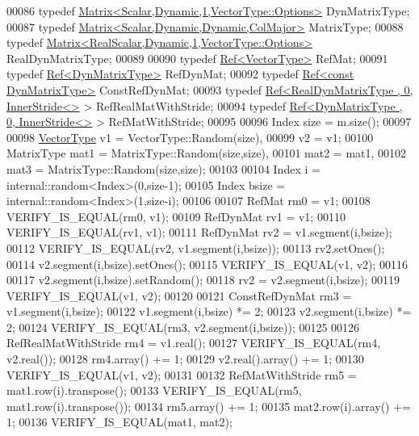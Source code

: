\begin{DoxyCode}
00086   \textcolor{keyword}{typedef} \hyperlink{group___core___module_class_eigen_1_1_matrix}{Matrix<Scalar,Dynamic,1,VectorType::Options>} 
      DynMatrixType;
00087   \textcolor{keyword}{typedef} \hyperlink{group___core___module_class_eigen_1_1_matrix}{Matrix<Scalar,Dynamic,Dynamic,ColMajor>} MatrixType;
00088   \textcolor{keyword}{typedef} \hyperlink{group___core___module_class_eigen_1_1_matrix}{Matrix<RealScalar,Dynamic,1,VectorType::Options>} 
      RealDynMatrixType;
00089   
00090   \textcolor{keyword}{typedef} \hyperlink{group___core___module_class_eigen_1_1_ref}{Ref<VectorType>} RefMat;
00091   \textcolor{keyword}{typedef} \hyperlink{group___core___module_class_eigen_1_1_ref}{Ref<DynMatrixType>} RefDynMat;
00092   \textcolor{keyword}{typedef} \hyperlink{group___core___module_class_eigen_1_1_ref}{Ref<const DynMatrixType>} ConstRefDynMat;
00093   \textcolor{keyword}{typedef} \hyperlink{group___core___module_class_eigen_1_1_ref}{Ref<RealDynMatrixType , 0, InnerStride<>} > 
      RefRealMatWithStride;
00094   \textcolor{keyword}{typedef} \hyperlink{group___core___module_class_eigen_1_1_ref}{Ref<DynMatrixType , 0, InnerStride<>} > RefMatWithStride;
00095 
00096   Index size = m.size();
00097   
00098   \hyperlink{struct_vector_type}{VectorType}  v1 = VectorType::Random(size),
00099               v2 = v1;
00100   MatrixType mat1 = MatrixType::Random(size,size),
00101              mat2 = mat1,
00102              mat3 = MatrixType::Random(size,size);
00103   
00104   Index i = internal::random<Index>(0,size-1);
00105   Index bsize = internal::random<Index>(1,size-i);
00106   
00107   RefMat rm0 = v1;
00108   VERIFY\_IS\_EQUAL(rm0, v1);
00109   RefDynMat rv1 = v1;
00110   VERIFY\_IS\_EQUAL(rv1, v1);
00111   RefDynMat rv2 = v1.segment(i,bsize);
00112   VERIFY\_IS\_EQUAL(rv2, v1.segment(i,bsize));
00113   rv2.setOnes();
00114   v2.segment(i,bsize).setOnes();
00115   VERIFY\_IS\_EQUAL(v1, v2);
00116   
00117   v2.segment(i,bsize).setRandom();
00118   rv2 = v2.segment(i,bsize);
00119   VERIFY\_IS\_EQUAL(v1, v2);
00120   
00121   ConstRefDynMat rm3 = v1.segment(i,bsize);
00122   v1.segment(i,bsize) *= 2;
00123   v2.segment(i,bsize) *= 2;
00124   VERIFY\_IS\_EQUAL(rm3, v2.segment(i,bsize));
00125   
00126   RefRealMatWithStride rm4 = v1.real();
00127   VERIFY\_IS\_EQUAL(rm4, v2.real());
00128   rm4.array() += 1;
00129   v2.real().array() += 1;
00130   VERIFY\_IS\_EQUAL(v1, v2);
00131   
00132   RefMatWithStride rm5 = mat1.row(i).transpose();
00133   VERIFY\_IS\_EQUAL(rm5, mat1.row(i).transpose());
00134   rm5.array() += 1;
00135   mat2.row(i).array() += 1;
00136   VERIFY\_IS\_EQUAL(mat1, mat2);

\end{DoxyCode}

